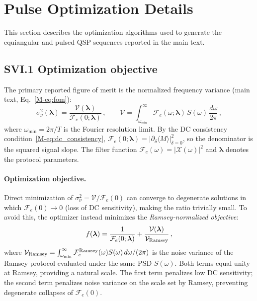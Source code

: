 \documentclass[aps,pra,twocolumn,superscriptaddress,longbibliography]{revtex4-2}
\newcommand{\be}{\begin{equation}}
\newcommand{\ee}{\end{equation}}
\begin{document}
\section{Pulse Optimization Details}
\label{supp:optimization}

This section describes the optimization algorithms used to generate the
equiangular and pulsed QSP sequences reported in the main text.

\subsection*{SVI.1 Optimization objective}

The primary reported figure of merit is the normalized frequency variance
(main text, Eq.~\eqref{M-eq:fom}):
\be
  \sigma^2_\nu(\boldsymbol{\lambda}) = \frac{\mathcal{V}(\boldsymbol{\lambda})}{\mathcal{F}_e(0;\boldsymbol{\lambda})}\,,
  \qquad
  \mathcal{V} = \int_{\omega_{\min}}^\infty \mathcal{F}_e(\omega;\boldsymbol{\lambda})\,S(\omega)\,
    \frac{d\omega}{2\pi}\,,
  \label{eq:fom_opt}
\ee
where $\omega_{\min} = 2\pi/T$ is the Fourier resolution limit.
By the DC consistency condition~\eqref{M-eq:dc_consistency},
$\mathcal{F}_e(0;\boldsymbol{\lambda}) = |\partial_\delta\langle M\rangle|^2_{\delta=0}$,
so the denominator is the squared signal slope.
The filter function $\mathcal{F}_e(\omega) = |\mathcal{X}(\omega)|^2$
and $\boldsymbol{\lambda}$ denotes the protocol parameters.

\paragraph{Optimization objective.}
Direct minimization of $\sigma^2_\nu = \mathcal{V}/\mathcal{F}_e(0)$ can converge
to degenerate solutions in which $\mathcal{F}_e(0)\to 0$ (loss of DC sensitivity),
making the ratio trivially small.
To avoid this, the optimizer instead minimizes the \emph{Ramsey-normalized objective}:
\be
  f(\boldsymbol{\lambda}) = \frac{1}{\mathcal{F}_e(0;\boldsymbol{\lambda})}
    + \frac{\mathcal{V}(\boldsymbol{\lambda})}{\mathcal{V}_{\rm Ramsey}}\,,
  \label{eq:score_rn_supp}
\ee
where $\mathcal{V}_{\rm Ramsey} = \int_{\omega_{\min}}^\infty \mathcal{F}_e^{\rm Ramsey}(\omega)
S(\omega)\,d\omega/(2\pi)$ is the noise variance of the Ramsey protocol evaluated
under the same PSD $S(\omega)$.
Both terms equal unity at Ramsey, providing a natural scale.
The first term penalizes low DC sensitivity; the second term penalizes noise variance
on the scale set by Ramsey, preventing degenerate collapses of $\mathcal{F}_e(0)$.
\end{document}
